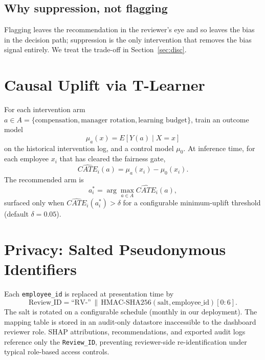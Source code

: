 \documentclass[conference]{IEEEtran}
\begin{document}
\subsection{Why suppression, not flagging}
Flagging leaves the recommendation in the reviewer's eye and so leaves the
bias in the decision path; suppression is the only intervention that removes
the bias signal entirely. We treat the trade-off in
Section~\ref{sec:disc}.

\section{Causal Uplift via T-Learner}
\label{sec:cate}

For each intervention arm $a \in A = \{\text{compensation},
\text{manager rotation}, \text{learning budget}\}$, train an outcome model
\begin{equation}
\mu_a(x) = E[Y(a) \mid X=x]
\end{equation}
on the historical intervention log, and a control model $\mu_0$. At inference
time, for each employee $x_i$ that has cleared the fairness gate,
\begin{equation}
\widehat{CATE}_i(a) = \mu_a(x_i) - \mu_0(x_i).
\end{equation}
The recommended arm is
\begin{equation}
a^*_i = \arg\max_{a \in A} \widehat{CATE}_i(a),
\end{equation}
surfaced only when $\widehat{CATE}_i(a^*_i) > \delta$ for a configurable
minimum-uplift threshold (default $\delta=0.05$).

\section{Privacy: Salted Pseudonymous Identifiers}
\label{sec:privacy}

Each \texttt{employee\_id} is replaced at presentation time by
\begin{equation}
\mathrm{Review\_ID} = \text{``RV-''} \,\|\, \mathrm{HMAC\text{-}SHA256}(\mathrm{salt}, \mathrm{employee\_id})[0:6].
\end{equation}
The salt is rotated on a configurable schedule (monthly in our deployment).
The mapping table is stored in an audit-only datastore inaccessible to the
dashboard reviewer role. SHAP attributions, recommendations, and exported
audit logs reference only the \texttt{Review\_ID}, preventing reviewer-side
re-identification under typical role-based access controls.
\end{document}

